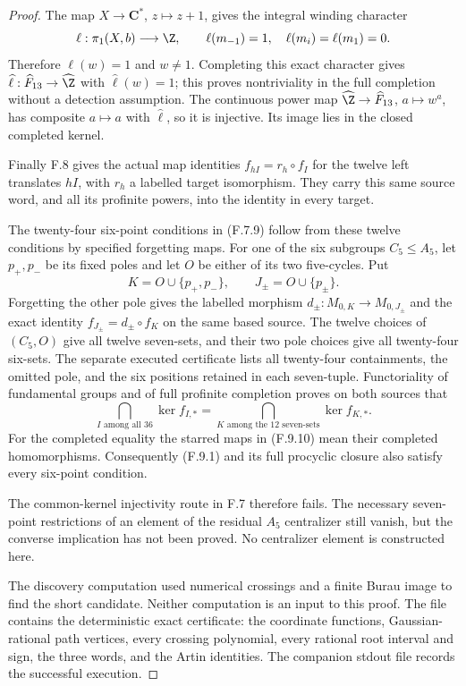 \begin{proof}
The map $X\to\mathbf C^*$, $z\mapsto z+1$, gives
the integral winding character
\[
 \ell:\pi_1(X,b)\longrightarrow\Z,
 \qquad
 \ell(m_{-1})=1,\quad \ell(m_i)=\ell(m_1)=0.
\]
Therefore $\ell(w)=1$ and $w\ne1$.
Completing this exact character gives
$\widehat\ell:\widehat F_{13}\to\widehat\Z$ with
$\widehat\ell(w)=1$; this proves nontriviality in the
full completion without a detection assumption.
The continuous power map $\widehat\Z\to\widehat F_{13}$,
$a\mapsto w^a$, has composite $a\mapsto a$ with
$\widehat\ell$, so it is injective.  Its image lies
in the closed completed kernel.

Finally F.8 gives the actual map identities
$f_{hI}=r_h\circ f_I$ for the twelve left translates
$hI$, with $r_h$ a labelled target isomorphism.
They carry this same source word, and all its
profinite powers, into the identity in every target.

The twenty-four six-point conditions in (F.7.9)
follow from these twelve conditions by specified
forgetting maps.  For one of the six subgroups
$C_5\le A_5$, let $p_+,p_-$ be its fixed poles and
let $O$ be either of its two five-cycles.  Put
\[
 K=O\cup\{p_+,p_-\},\qquad J_\pm=O\cup\{p_\pm\}.
\]
Forgetting the other pole gives the labelled morphism
$d_\pm:M_{0,K}\to M_{0,J_\pm}$ and the exact identity
$f_{J_\pm}=d_\pm\circ f_K$ on the same based source.
The twelve choices of $(C_5,O)$ give all twelve
seven-sets, and their two pole choices give all
twenty-four six-sets.  The separate executed certificate
lists all twenty-four containments, the omitted pole,
and the six positions retained in each seven-tuple.
Functoriality of fundamental groups and of full
profinite completion proves on both sources that
\[
 \bigcap_{I\text{ among all }36}\ker f_{I,*}
       =\bigcap_{K\text{ among the }12\text{ seven-sets}}
                                      \ker f_{K,*}.     \tag{F.9.10}
\]
For the completed equality the starred maps in
(F.9.10) mean their completed homomorphisms.
Consequently (F.9.1) and its full procyclic closure
also satisfy every six-point condition.

The common-kernel injectivity route in F.7 therefore
fails.  The necessary seven-point restrictions of
an element of the residual $A_5$ centralizer still
vanish, but the converse implication has not been
proved.  No centralizer element is constructed here.

The discovery computation used numerical crossings
and a finite Burau image to find the short candidate.
Neither computation is an input to this proof.
The file
contains the deterministic exact certificate:
the coordinate functions, Gaussian-rational path
vertices, every crossing polynomial, every rational
root interval and sign, the three words, and the
Artin identities.  The companion stdout file records
the successful execution.
\end{proof}
